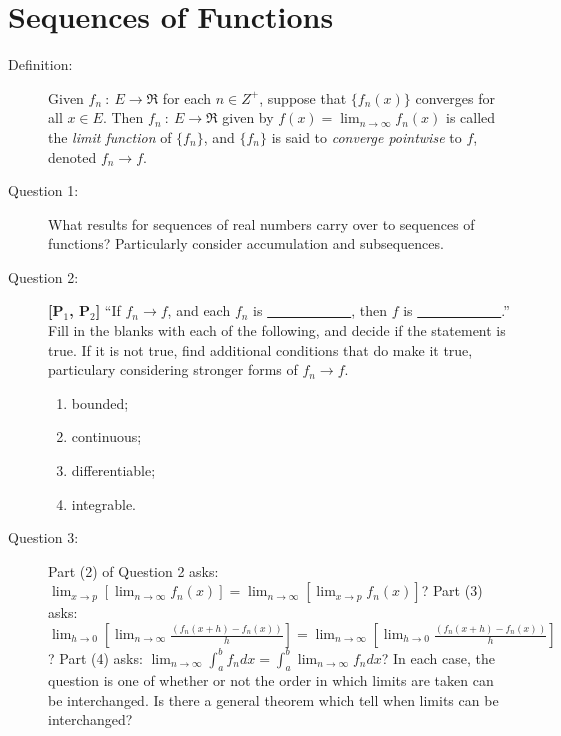 \documentclass{article}
\begin{document}
\newpage

\section{Sequences of Functions}

\begin{description}

  \item[Definition:] Given $f_n\ :\ E \to \Re$ for each $n \in Z^+$, suppose that $\{ f_n(x) \}$ converges for all $x \in E$. Then $f_n\ :\ E \to \Re$ given by $\displaystyle f(x) = \lim_{n \to \infty} f_n(x)$ is called the \emph{limit function} of $\{ f_n \}$, and $\{ f_n \}$ is said to \emph{converge pointwise} to $f$, denoted $f_n \to f$.

  \item[Question 1:] What results for sequences of real numbers carry over to sequences of functions? Particularly consider accumulation and subsequences.

  \item[Question 2:] \textbf{[P$_1$, P$_2$]} ``If $f_n \to f$, and each $f_n$ is \underline{\ \ \ \ \ \ \ \ \ \ \ \ }, then $f$ is \underline{\ \ \ \ \ \ \ \ \ \ \ \ }.'' Fill in the blanks with each of the following, and decide if the statement is true. If it is not true, find additional conditions that do make it true, particulary considering stronger forms of $f_n \to f$.
    \begin{enumerate}[\hspace{1cm}(1)]
      \item bounded;
      \item continuous;
      \item differentiable;
      \item integrable.
    \end{enumerate}

  \item[Question 3:] Part (2) of Question 2 asks: $\displaystyle \lim_{x \to p} [\lim_{n \to \infty} f_n(x)] = \lim_{n \to \infty} [\lim_{x \to p} f_n(x)]$? Part (3) asks: {\scriptsize $\displaystyle \lim_{h \to 0} \left[ \lim_{n \to \infty} \frac{( f_n(x+h) - f_n(x) )}{h} \right] = \lim_{n \to \infty} \left[ \lim_{h \to 0} \frac{( f_n(x+h) - f_n(x) )}{h} \right]$}? Part (4) asks: $\displaystyle \lim_{n \to \infty} \int_a^b f_n dx = \int_a^b \lim_{n \to \infty} f_n dx$? In each case, the question is one of whether or not the order in which limits are taken can be interchanged. Is there a general theorem which tell when limits can be interchanged?


\end{description}
\end{document}

